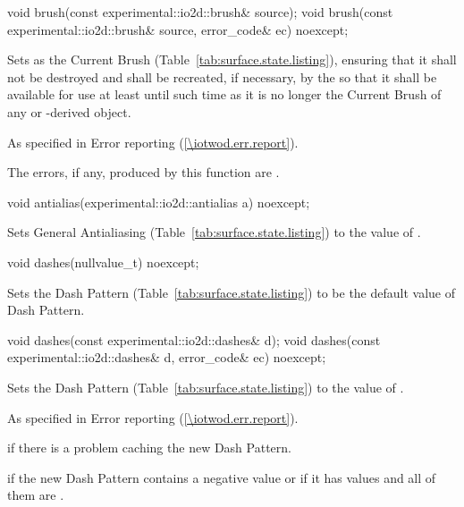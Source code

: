 \begin{itemdecl}
void brush(const experimental::io2d::brush& source);
void brush(const experimental::io2d::brush& source,
  error_code& ec) noexcept;
\end{itemdecl}
\begin{itemdescr}
\pnum
\effects
Sets  as the Current Brush (Table~\ref{tab:surface.state.listing}), ensuring that it shall not be destroyed and shall be recreated, if necessary, by the \underlyingrendandpresenttechs so that it shall be available for use at least until such time as it is no longer the Current Brush of any  or -derived object.

\pnum
\throws
As specified in Error reporting (\ref{\iotwod.err.report}).

\pnum
\errors
The errors, if any, produced by this function are .
\end{itemdescr}

\begin{itemdecl}
void antialias(experimental::io2d::antialias a) noexcept;
\end{itemdecl}
\begin{itemdescr}
\pnum
\effects
Sets General Antialiasing (Table~\ref{tab:surface.state.listing}) to the value of .
\end{itemdescr}

\begin{itemdecl}
void dashes(nullvalue_t) noexcept;
\end{itemdecl}
\begin{itemdescr}
\pnum
\effects
Sets the Dash Pattern (Table~\ref{tab:surface.state.listing}) to be the default value of Dash Pattern.
\end{itemdescr}

\begin{itemdecl}
void dashes(const experimental::io2d::dashes& d);
void dashes(const experimental::io2d::dashes& d, error_code& ec) noexcept;
\end{itemdecl}
\begin{itemdescr}
\pnum
\effects
Sets the Dash Pattern (Table~\ref{tab:surface.state.listing}) to the value of .

\pnum
\throws
As specified in Error reporting (\ref{\iotwod.err.report}).

\pnum
\errors
{} if there is a problem caching the new Dash Pattern.

\pnum
{} if the new Dash Pattern contains a negative value or if it has values and all of them are .
\end{itemdescr}

